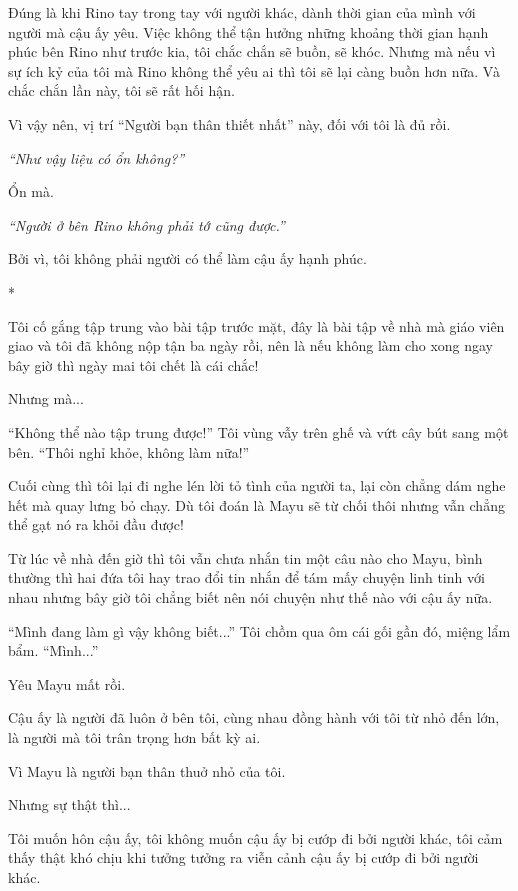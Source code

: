 {    Đúng là khi Rino tay trong tay với người khác, dành thời gian của mình
    với người mà cậu ấy yêu. Việc không thể tận hưởng những khoảng thời gian
    hạnh phúc bên Rino như trước kia, tôi chắc chắn sẽ buồn, sẽ khóc. Nhưng
    mà nếu vì sự ích kỷ của tôi mà Rino không thể yêu ai thì tôi sẽ lại càng
    buồn hơn nữa. Và chắc chắn lần này, tôi sẽ rất hối hận.

    Vì vậy nên, vị trí ``Người bạn thân thiết nhất'' này, đối với tôi là đủ
    rồi.

    \emph{``Như vậy liệu có ổn không?''}

    Ổn mà.

    \emph{``Người ở bên Rino không phải tớ cũng được.''}

    Bởi vì, tôi không phải người có thể làm cậu ấy hạnh phúc.

    *

    Tôi cố gắng tập trung vào bài tập trước mặt, đây là bài tập về nhà mà
    giáo viên giao và tôi đã không nộp tận ba ngày rồi, nên là nếu không làm
    cho xong ngay bây giờ thì ngày mai tôi chết là cái chắc!

    Nhưng mà...

    ``Không thể nào tập trung được!'' Tôi vùng vẫy trên ghế và vứt cây bút
    sang một bên. ``Thôi nghỉ khỏe, không làm nữa!''

    Cuối cùng thì tôi lại đi nghe lén lời tỏ tình của người ta, lại còn
    chẳng dám nghe hết mà quay lưng bỏ chạy. Dù tôi đoán là Mayu sẽ từ chối
    thôi nhưng vẫn chẳng thể gạt nó ra khỏi đầu được!

    Từ lúc về nhà đến giờ thì tôi vẫn chưa nhắn tin một câu nào cho Mayu,
    bình thường thì hai đứa tôi hay trao đổi tin nhắn để tám mấy chuyện linh
    tinh với nhau nhưng bây giờ tôi chẳng biết nên nói chuyện như thế nào
    với cậu ấy nữa.

    ``Mình đang làm gì vậy không biết...'' Tôi chồm qua ôm cái gối gần đó,
    miệng lẩm bẩm. ``Mình...''

    Yêu Mayu mất rồi.

    Cậu ấy là người đã luôn ở bên tôi, cùng nhau đồng hành với tôi từ nhỏ
    đến lớn, là người mà tôi trân trọng hơn bất kỳ ai.

    Vì Mayu là người bạn thân thuở nhỏ của tôi.

    Nhưng sự thật thì...

    Tôi muốn hôn cậu ấy, tôi không muốn cậu ấy bị cướp đi bởi người khác,
    tôi cảm thấy thật khó chịu khi tưởng tưởng ra viễn cảnh cậu ấy bị cướp
    đi bởi người khác.

}
